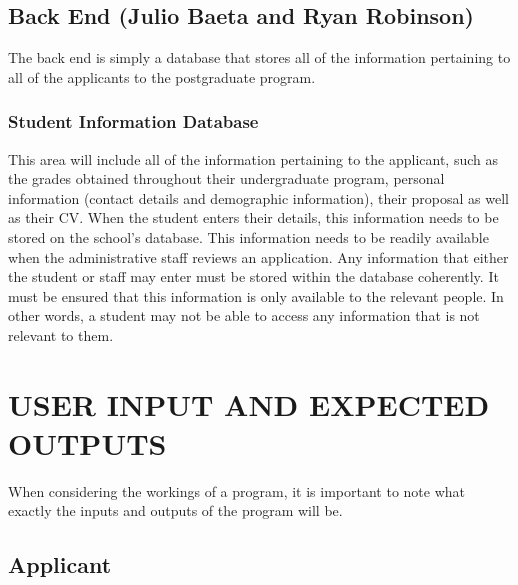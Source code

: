 \documentclass[journal,comsoc]{IEEEtran}
\begin{document}

\subsection{Back End (Julio Baeta and Ryan Robinson)}

The back end is simply a database that stores all of the information pertaining to all of the applicants to the postgraduate program. \vspace{2mm}


\subsubsection{Student Information Database}

\hfill \break This area will include all of the information pertaining to the applicant, such as the grades obtained throughout their undergraduate program, personal information (contact details and demographic information), their proposal as well as their CV. When the student enters their details, this information needs to be stored on the school's database. This information needs to be readily available when the administrative staff reviews an application. Any information that either the student or staff may enter must be stored within the database coherently. It must be ensured that this information is only available to the relevant people. In other words, a student may not be able to access any information that is not relevant to them.\\


\section{USER INPUT AND EXPECTED OUTPUTS}

When considering the workings of a program, it is important to note what exactly the inputs and outputs of the program will be.


\subsection{Applicant}
\end{document}
